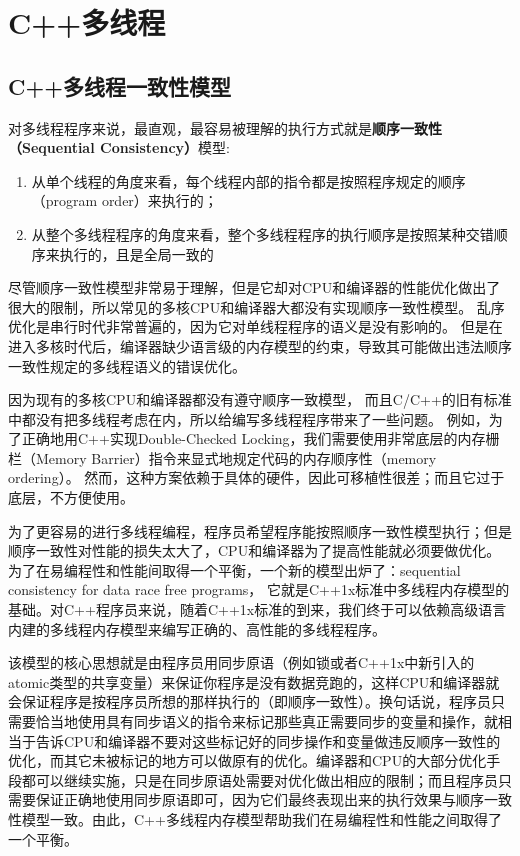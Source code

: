 \section{C++多线程}

\subsection{C++多线程一致性模型}

对多线程程序来说，最直观，最容易被理解的执行方式就是\textbf{顺序一致性（Sequential Consistency）}模型:
\begin{enumerate}
\item 从单个线程的角度来看，每个线程内部的指令都是按照程序规定的顺序（program order）来执行的；
\item 从整个多线程程序的角度来看，整个多线程程序的执行顺序是按照某种交错顺序来执行的，且是全局一致的
\end{enumerate}

尽管顺序一致性模型非常易于理解，但是它却对CPU和编译器的性能优化做出了很大的限制，所以常见的多核CPU和编译器大都没有实现顺序一致性模型。
乱序优化是串行时代非常普遍的，因为它对单线程程序的语义是没有影响的。
但是在进入多核时代后，编译器缺少语言级的内存模型的约束，导致其可能做出违法顺序一致性规定的多线程语义的错误优化。

因为现有的多核CPU和编译器都没有遵守顺序一致模型，
而且C/C++的旧有标准中都没有把多线程考虑在内，所以给编写多线程程序带来了一些问题。
例如，为了正确地用C++实现Double-Checked Locking，我们需要使用非常底层的内存栅栏（Memory Barrier）指令来显式地规定代码的内存顺序性（memory ordering）。
然而，这种方案依赖于具体的硬件，因此可移植性很差；而且它过于底层，不方便使用。

为了更容易的进行多线程编程，程序员希望程序能按照顺序一致性模型执行；但是顺序一致性对性能的损失太大了，CPU和编译器为了提高性能就必须要做优化。
为了在易编程性和性能间取得一个平衡，一个新的模型出炉了：sequential consistency for data race free programs，
它就是C++1x标准中多线程内存模型的基础。对C++程序员来说，随着C++1x标准的到来，我们终于可以依赖高级语言内建的多线程内存模型来编写正确的、高性能的多线程程序。

该模型的核心思想就是由程序员用同步原语（例如锁或者C++1x中新引入的atomic类型的共享变量）来保证你程序是没有数据竞跑的，这样CPU和编译器就会保证程序是按程序员所想的那样执行的（即顺序一致性）。换句话说，程序员只需要恰当地使用具有同步语义的指令来标记那些真正需要同步的变量和操作，就相当于告诉CPU和编译器不要对这些标记好的同步操作和变量做违反顺序一致性的优化，而其它未被标记的地方可以做原有的优化。编译器和CPU的大部分优化手段都可以继续实施，只是在同步原语处需要对优化做出相应的限制；而且程序员只需要保证正确地使用同步原语即可，因为它们最终表现出来的执行效果与顺序一致性模型一致。由此，C++多线程内存模型帮助我们在易编程性和性能之间取得了一个平衡。



